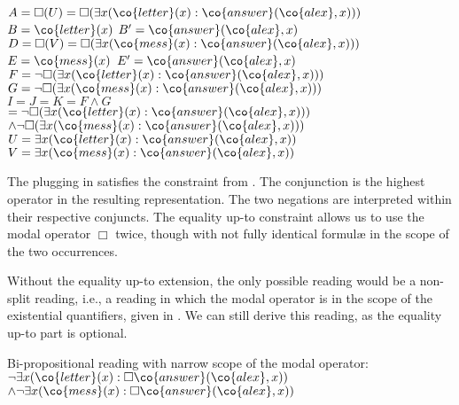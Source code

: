 \documentclass[output=paper]{langsci/langscibook}
\begin{document}
\ea \label{plug-brauch-bi}
$A = \Box(U) = \Box(\exists x (\co{letter}(x) : \co{answer}(\co{alex},x)))$\\
$B = \co{letter}(x)$
\qquad $B' = \co{answer}(\co{alex},x)$\\
$D = \Box(V) = \Box(\exists x (\co{mess}(x) : \co{answer}(\co{alex},x)))$\\
$E= \co{mess}(x)$
\qquad $E'= \co{answer}(\co{alex},x)$\\
$F= \lnot \Box(\exists x (\co{letter}(x) : \co{answer}(\co{alex},x)))$\\
$G= \lnot \Box(\exists x (\co{mess}(x) : \co{answer}(\co{alex},x)))$\\
$I=J=K= F\land G$\\
\hspace*{3em} $= 
\lnot \Box(\exists x (\co{letter}(x) : \co{answer}(\co{alex},x)))$\\
\hspace*{\fill} $\land 
\lnot \Box(\exists x (\co{mess}(x) : \co{answer}(\co{alex},x)))
$\\
$U= \exists x (\co{letter}(x) : \co{answer}(\co{alex},x))$\\
$V= \exists x (\co{mess}(x) : \co{answer}(\co{alex},x))$
\z 

The plugging in  satisfies the constraint from .
The conjunction is the highest operator in the resulting representation. The two negations are interpreted within their respective conjuncts. The equality up-to constraint allows us to use the modal operator $\Box$ twice, though with not fully identical formul\ae{} in the scope of the two occurrences.


Without the equality up-to extension,
the only possible reading would be a non-split reading, i.e., a reading in which the modal operator is in the scope of the existential quantifiers, given in .
We can still derive this reading, as the equality up-to part is optional.

\ea \label{brauch-brief-mail-biWide}
Bi-propositional reading with narrow scope of the modal operator:\\
$\lnot \exists x (\co{letter}(x) : \Box \co{answer}(\co{alex}, x))$%
$\land 
\lnot \exists x (\co{mess}(x) : \Box \co{answer}(\co{alex}, x)) 
$
\z 



\end{document}
